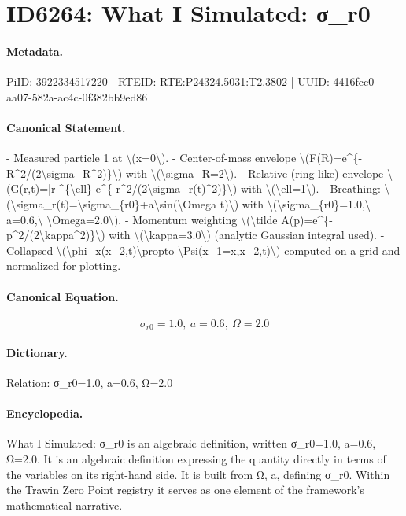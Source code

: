 \section*{ID6264: What I Simulated: σ\_r0}
\paragraph{Metadata.}
PiID: 3922334517220 | RTEID: RTE:P24324.5031:T2.3802 | UUID: 4416fcc0-aa07-582a-ac4c-0f382bb9ed86

\paragraph{Canonical Statement.}
- Measured particle 1 at \textbackslash{}(x=0\textbackslash{}). - Center-of-mass envelope \textbackslash{}(F(R)=e\textasciicircum{}\{-R\textasciicircum{}2/(2\textbackslash{}sigma\_R\textasciicircum{}2)\}\textbackslash{}) with \textbackslash{}(\textbackslash{}sigma\_R=2\textbackslash{}). - Relative (ring-like) envelope \textbackslash{}(G(r,t)=|r|\textasciicircum{}\{\textbackslash{}ell\} e\textasciicircum{}\{-r\textasciicircum{}2/(2\textbackslash{}sigma\_r(t)\textasciicircum{}2)\}\textbackslash{}) with \textbackslash{}(\textbackslash{}ell=1\textbackslash{}). - Breathing: \textbackslash{}(\textbackslash{}sigma\_r(t)=\textbackslash{}sigma\_\{r0\}+a\textbackslash{}sin(\textbackslash{}Omega t)\textbackslash{}) with \textbackslash{}(\textbackslash{}sigma\_\{r0\}=1.0,\textbackslash{} a=0.6,\textbackslash{} \textbackslash{}Omega=2.0\textbackslash{}). - Momentum weighting \textbackslash{}(\textbackslash{}tilde A(p)=e\textasciicircum{}\{-p\textasciicircum{}2/(2\textbackslash{}kappa\textasciicircum{}2)\}\textbackslash{}) with \textbackslash{}(\textbackslash{}kappa=3.0\textbackslash{}) (analytic Gaussian integral used). - Collapsed \textbackslash{}(\textbackslash{}phi\_x(x\_2,t)\textbackslash{}propto \textbackslash{}Psi(x\_1=x,x\_2,t)\textbackslash{}) computed on a grid and normalized for plotting.

\paragraph{Canonical Equation.}
\[
\sigma_{r0}=1.0,\ a=0.6,\ \Omega=2.0
\]

\paragraph{Dictionary.}
Relation: σ\_r0=1.0, a=0.6, Ω=2.0

\paragraph{Encyclopedia.}
What I Simulated: σ\_r0 is an algebraic definition, written σ\_r0=1.0, a=0.6, Ω=2.0. It is an algebraic definition expressing the quantity directly in terms of the variables on its right-hand side. It is built from Ω, a, defining σ\_r0. Within the Trawin Zero Point registry it serves as one element of the framework's mathematical narrative.
